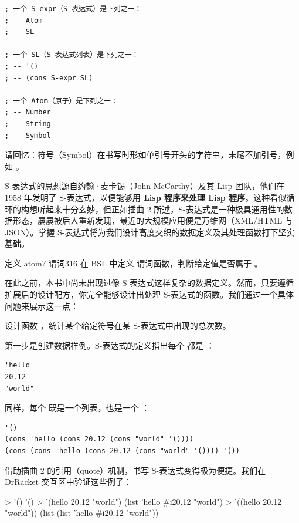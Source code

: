\begin{lstlisting}[language=BSL]
; 一个 S-expr（S-表达式）是下列之一：
; -- Atom
; -- SL

; 一个 SL（S-表达式列表）是下列之一：
; -- '()
; -- (cons S-expr SL)

; 一个 Atom（原子）是下列之一：
; -- Number
; -- String
; -- Symbol
\end{lstlisting}

请回忆：符号（Symbol）在书写时形如单引号开头的字符串，末尾不加引号，例如 。

S-表达式的思想源自约翰·麦卡锡（John McCarthy）及其 Lisp 团队，他们在 1958 年发明了 S-表达式，以便能够\textbf{用 Lisp 程序来处理 Lisp 程序}。这种看似循环的构想听起来十分玄妙，但正如插曲 2 所述，S-表达式是一种极具通用性的数据形态，屡屡被后人重新发现，最近的大规模应用便是万维网（XML/HTML 与 JSON）。掌握 S-表达式将为我们设计高度交织的数据定义及其处理函数打下坚实基础。

\begin{exercise}{定义 atom? 谓词}{316}
在 BSL 中定义  谓词函数，判断给定值是否属于 。
\end{exercise}

在此之前，本书中尚未出现过像 S-表达式这样复杂的数据定义。然而，只要遵循扩展后的设计配方，你完全能够设计出处理 S-表达式的函数。我们通过一个具体问题来展示这一点：

\begin{notebox}[样本问题]
设计函数 ，统计某个给定符号在某 S-表达式中出现的总次数。
\end{notebox}

第一步是创建数据样例。S-表达式的定义指出每个  都是 ：
\begin{lstlisting}[language=BSL]
'hello
20.12
"world"
\end{lstlisting}

同样，每个  既是一个列表，也是一个 ：
\begin{lstlisting}[language=BSL]
'()
(cons 'hello (cons 20.12 (cons "world" '())))
(cons (cons 'hello (cons 20.12 (cons "world" '()))) '())
\end{lstlisting}

借助插曲 2 的引用（quote）机制，书写 S-表达式变得极为便捷。我们在 DrRacket 交互区中验证这些例子：

\begin{replbox}
> '()
'()
> '(hello 20.12 "world")
(list 'hello #i20.12 "world")
> '((hello 20.12 "world"))
(list (list 'hello #i20.12 "world"))
\end{replbox}

